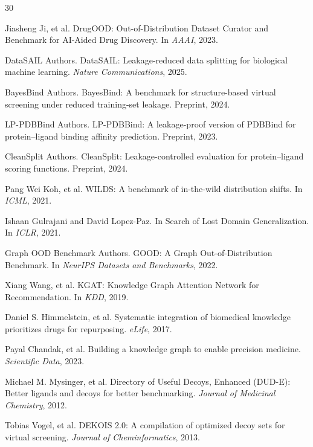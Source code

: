 \documentclass[11pt]{article}
\begin{document}
\begin{thebibliography}{30}

Jiasheng Ji, et al.
\newblock DrugOOD: Out-of-Distribution Dataset Curator and Benchmark for AI-Aided Drug Discovery.
\newblock In \emph{AAAI}, 2023.

DataSAIL Authors.
\newblock DataSAIL: Leakage-reduced data splitting for biological machine learning.
\newblock \emph{Nature Communications}, 2025.

BayesBind Authors.
\newblock BayesBind: A benchmark for structure-based virtual screening under reduced training-set leakage.
\newblock Preprint, 2024.

LP-PDBBind Authors.
\newblock LP-PDBBind: A leakage-proof version of PDBBind for protein--ligand binding affinity prediction.
\newblock Preprint, 2023.

CleanSplit Authors.
\newblock CleanSplit: Leakage-controlled evaluation for protein--ligand scoring functions.
\newblock Preprint, 2024.

Pang Wei Koh, et al.
\newblock WILDS: A benchmark of in-the-wild distribution shifts.
\newblock In \emph{ICML}, 2021.

Ishaan Gulrajani and David Lopez-Paz.
\newblock In Search of Lost Domain Generalization.
\newblock In \emph{ICLR}, 2021.

Graph OOD Benchmark Authors.
\newblock GOOD: A Graph Out-of-Distribution Benchmark.
\newblock In \emph{NeurIPS Datasets and Benchmarks}, 2022.

Xiang Wang, et al.
\newblock KGAT: Knowledge Graph Attention Network for Recommendation.
\newblock In \emph{KDD}, 2019.

Daniel S. Himmelstein, et al.
\newblock Systematic integration of biomedical knowledge prioritizes drugs for repurposing.
\newblock \emph{eLife}, 2017.

Payal Chandak, et al.
\newblock Building a knowledge graph to enable precision medicine.
\newblock \emph{Scientific Data}, 2023.

Michael M. Mysinger, et al.
\newblock Directory of Useful Decoys, Enhanced (DUD-E): Better ligands and decoys for better benchmarking.
\newblock \emph{Journal of Medicinal Chemistry}, 2012.

Tobias Vogel, et al.
\newblock DEKOIS 2.0: A compilation of optimized decoy sets for virtual screening.
\newblock \emph{Journal of Cheminformatics}, 2013.


\end{thebibliography}
\end{document}
